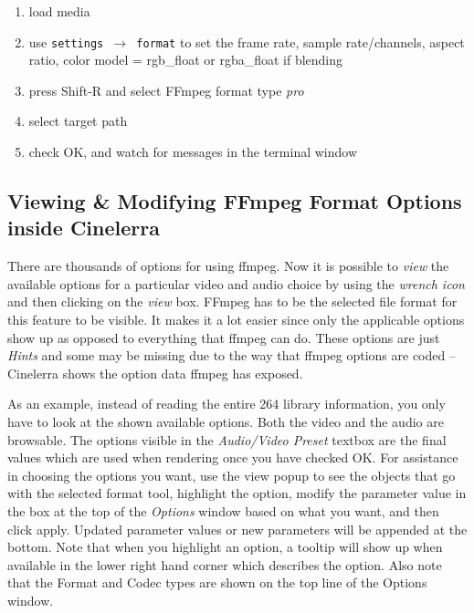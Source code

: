 \begin{enumerate}
    \item load media
    \item use \texttt{settings $\rightarrow$ format} to set the frame rate, sample rate/channels, aspect ratio, 
    color model = rgb\_float or rgba\_float if blending
    \item press Shift-R and select FFmpeg format type \textit{pro}
    \item select target path
    \item check OK, and watch for messages in the terminal window
\end{enumerate}

\subsection{Viewing \& Modifying FFmpeg Format Options inside Cinelerra}%
\label{sub:viewing_modifying_ffmpeg_cinelerra}

There are thousands of options for using ffmpeg.  Now it is possible to \textit{view} the available options for a particular video and audio choice by using the \textit{wrench icon} and then clicking on the \textit{view} box.  FFmpeg has to be the selected file format for this feature to be visible.  It makes it a lot easier since only the applicable options show up as opposed to everything that ffmpeg can do.  These options are just \textit{Hints} and some may be missing due to the way that ffmpeg options are coded -- Cinelerra shows the option data ffmpeg has exposed.

As an example, instead of reading the entire 264 library information, you only have to look at the shown available options.  Both the video and the audio are browsable. The options visible in the \textit{Audio/Video Preset} textbox are the final values which are used when rendering once you have checked OK.  For assistance in choosing the options you want, use the view popup to see the objects that go with the selected format tool, highlight the option, modify the parameter value in the box at the top of the \textit{Options} window based on what you want, and then click apply.  Updated parameter values or new parameters will be appended at the bottom.  Note that when you highlight an option, a tooltip will show up when available in the lower right hand corner which describes the option.  Also note that the Format and Codec types are shown on the top line of the Options window.

